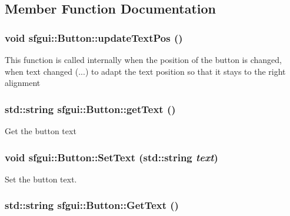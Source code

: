 \subsection{Member Function Documentation}
\hypertarget{classsfgui_1_1Button_1e1eade317f3b603011067e4997b0725}{
\subsubsection[updateTextPos]{\setlength{\rightskip}{0pt plus 5cm}void sfgui::Button::updateTextPos ()}}
\label{classsfgui_1_1Button_1e1eade317f3b603011067e4997b0725}




This function is called internally when the position of the button is changed, when text changed (...) to adapt the text position so that it stays to the right alignment \hypertarget{classsfgui_1_1Button_015166159ef486c5001c5b58e79abc2d}{
\subsubsection[getText]{\setlength{\rightskip}{0pt plus 5cm}std::string sfgui::Button::getText ()}}
\label{classsfgui_1_1Button_015166159ef486c5001c5b58e79abc2d}




Get the button text \hypertarget{classsfgui_1_1Button_48ddf97b9a9f77517f5bf70e93df2b80}{
\subsubsection[SetText]{\setlength{\rightskip}{0pt plus 5cm}void sfgui::Button::SetText (std::string {\em text})}}
\label{classsfgui_1_1Button_48ddf97b9a9f77517f5bf70e93df2b80}




Set the button text. \hypertarget{classsfgui_1_1Button_f731f8fe61ce30a7e405d8d3a56c5f22}{
\subsubsection[GetText]{\setlength{\rightskip}{0pt plus 5cm}std::string sfgui::Button::GetText ()}}
\label{classsfgui_1_1Button_f731f8fe61ce30a7e405d8d3a56c5f22}


